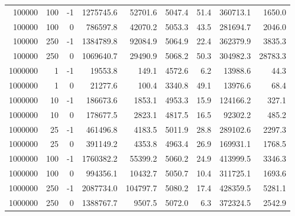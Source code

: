 \begin{longtable}{rrrrrrrrr}
  100000 &        100 &       -1 &           1275745.6 &   52701.6 &                 5047.4 &   51.4 &           360713.1 &   1650.0 \\
  100000 &        100 &        0 &            786597.8 &   42070.2 &                 5053.3 &   43.5 &           281694.7 &   2046.0 \\
  100000 &        250 &       -1 &           1384789.8 &   92084.9 &                 5064.9 &   22.4 &           362379.9 &   3835.3 \\
  100000 &        250 &        0 &           1069640.7 &   29490.9 &                 5068.2 &   50.3 &           304982.3 &  28783.3 \\
 1000000 &          1 &       -1 &             19553.8 &     149.1 &                 4572.6 &    6.2 &            13988.6 &     44.3 \\
 1000000 &          1 &        0 &             21277.6 &     100.4 &                 3340.8 &   49.1 &            13976.6 &     68.4 \\
 1000000 &         10 &       -1 &            186673.6 &    1853.1 &                 4953.3 &   15.9 &           124166.2 &    327.1 \\
 1000000 &         10 &        0 &            178677.5 &    2823.1 &                 4817.5 &   16.5 &            92302.2 &    485.2 \\
 1000000 &         25 &       -1 &            461496.8 &    4183.5 &                 5011.9 &   28.8 &           289102.6 &   2297.3 \\
 1000000 &         25 &        0 &            391149.2 &    4353.8 &                 4963.4 &   26.9 &           169931.1 &   1768.5 \\
 1000000 &        100 &       -1 &           1760382.2 &   55399.2 &                 5060.2 &   24.9 &           413999.5 &   3346.3 \\
 1000000 &        100 &        0 &            994356.1 &   10432.7 &                 5050.7 &   10.4 &           311725.1 &   1693.6 \\
 1000000 &        250 &       -1 &           2087734.0 &  104797.7 &                 5080.2 &   17.4 &           428359.5 &   5281.1 \\
 1000000 &        250 &        0 &           1388767.7 &    9507.5 &                 5072.0 &    6.3 &           372324.5 &   2542.9 \\
\end{longtable}
